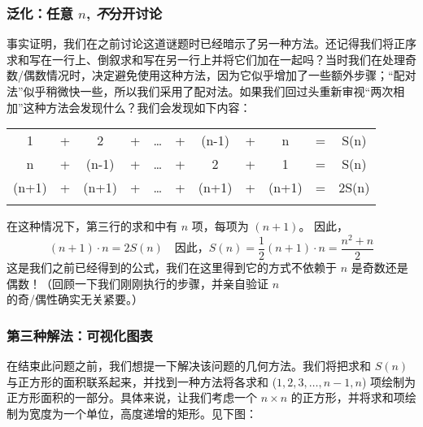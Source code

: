 \subsubsection*{泛化：任意 $n$, \emph{不}分开讨论}

事实证明，我们在之前讨论这道谜题时已经暗示了另一种方法。还记得我们将正序求和写在一行上、倒叙求和写在另一行上并将它们加在一起吗？当时我们在处理奇数/偶数情况时，决定避免使用这种方法，因为它似乎增加了一些额外步骤；``配对法''似乎稍微快一些，所以我们采用了配对法。如果我们回过头重新审视``两次相加''这种方法会发现什么？我们会发现如下内容：

\begin{center}
    \begin{tabular}{ccccccccccc}
           1  & + &     2 & + & \dots & + & (n-1) & + &     n & = & S(n)\\\noalign{\smallskip\smallskip}
           n  & + & (n-1) & + & \dots & + &     2 & + &     1 & = & S(n)\\\noalign{\smallskip\smallskip}
        \hline
        (n+1) & + & (n+1) & + & \dots & + & (n+1) & + & (n+1) & = & 2S(n)\\\noalign{\smallskip\smallskip}
    \end{tabular}
\end{center}
在这种情况下，第三行的求和中有 $n$ 项，每项为 $(n + 1)$。 因此，
\[(n+1) \cdot n = 2S(n) \quad \text{因此，} S(n) = \frac{1}{2}(n+1) \cdot n = \frac{n^2+n}{2}\]
这是我们之前已经得到的公式，我们在这里得到它的方式不依赖于 $n$ 是奇数还是偶数！（回顾一下我们刚刚执行的步骤，并亲自验证 $n$ 的奇/偶性确实无关紧要。）

\subsubsection*{第三种解法：可视化图表}

在结束此问题之前，我们想提一下解决该问题的几何方法。我们将把求和 $S(n)$ 与正方形的面积联系起来，并找到一种方法将各求和 ($1, 2, 3, \dots, n - 1, n$) 项绘制为正方形面积的一部分。具体来说，让我们考虑一个 $n \times n$ 的正方形，并将求和项绘制为宽度为一个单位，高度递增的矩形。见下图：

\begin{center}
\end{center}

